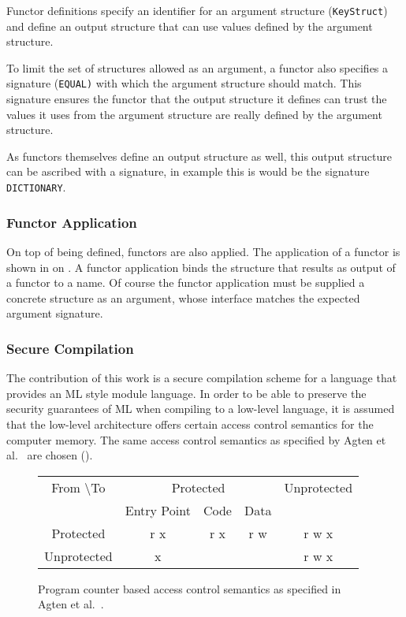 \documentclass[11pt]{article}
\begin{document}
Functor definitions specify an identifier for an argument structure (\lstinline{KeyStruct}) and define an output structure that can use values defined by the argument structure. 

To limit the set of structures allowed as an argument, a functor also specifies a signature (\lstinline{EQUAL)} with which the argument structure should match.
This signature ensures the functor that the output structure it defines can trust the values it uses from the argument structure are really defined by the argument structure.

As functors themselves define an output structure as well, this output structure can be ascribed with a signature, in example  this is would be the signature \lstinline{DICTIONARY}.

\subsubsection{Functor Application}
On top of being defined, functors are also applied.
The application of a functor is shown in  on .
A functor application binds the structure that results as output of a functor to a name.
Of course the functor application must be supplied a concrete structure as an argument, whose interface matches the expected argument signature.

\subsubsection{Secure Compilation}

The contribution of this work is a secure compilation scheme for a language that provides an ML style module language.
In order to be able to preserve the security guarantees of ML when compiling to a low-level language, it is assumed that the low-level architecture offers certain access control semantics for the computer memory.
The same access control semantics as specified by Agten et al.~\cite{Agten:2012:SCM:2354412.2355247} are chosen ().

\begin{figure}[htb]
    \centering
	\begin{tabular}{|c|c|c|c|c|}
		\hline
		From \textbackslash To & \multicolumn{3}{c|}{Protected} & Unprotected \\
		& Entry Point & Code & Data & \\ \hline
		Protected & r x & r x & r w & r w x \\ \hline
		Unprotected & x & & & r w x \\ \hline
	\end{tabular}
    \caption[PCBAC Semantics]{Program counter based access control semantics as specified in Agten et al.~\cite{Agten:2012:SCM:2354412.2355247}. \label{fig:PCBAC}}
\end{figure}
\end{document}
